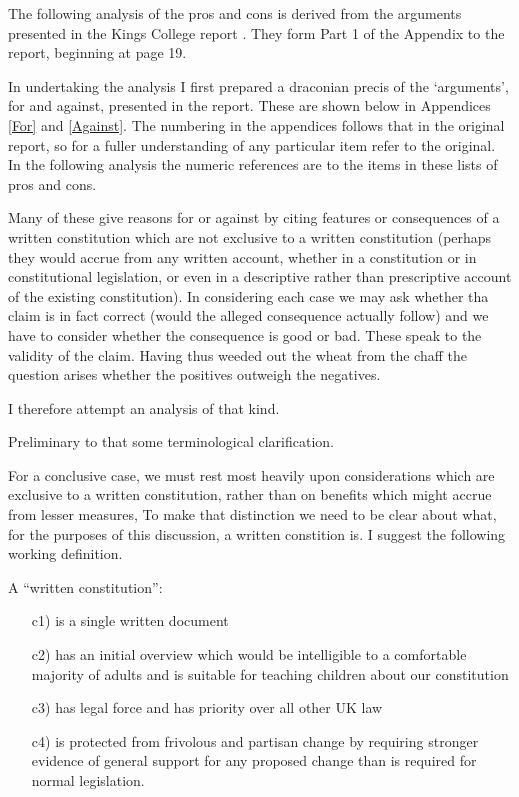 \documentclass[14pt,titlepage]{extarticle}
\begin{document}
The following analysis of the pros and cons is derived from the arguments presented in the Kings College report \cite{rbjw003}.
They form Part 1 of the Appendix to the report, beginning at page 19.

In undertaking the analysis I first prepared a draconian precis of the `arguments', for and against, presented in the report.
These are shown below in Appendices \ref{For} and \ref{Against}.
The numbering in the appendices follows that in the original report, so for a fuller understanding of any particular item refer to the original.
In the following analysis the numeric references are to the items in these lists of pros and cons.

Many of these give reasons for or against by citing features or consequences of a written constitution which are not exclusive to a written constitution (perhaps they would accrue from any written account, whether in a constitution or in constitutional legislation, or even in a descriptive rather than prescriptive account of the existing constitution).
In considering each case we may ask whether tha claim is in fact correct (would the alleged consequence actually follow) and we have to consider whether the consequence is good or bad.
These speak to the validity of the claim.
Having thus weeded out the wheat from the chaff the question arises whether the positives outweigh the negatives.

I therefore attempt an analysis of that kind.

Preliminary to that some terminological clarification.

For a conclusive case, we must rest most heavily upon considerations which are exclusive to a written constitution, rather than on benefits which might accrue from lesser measures,
To make that distinction we need to be clear about what, for the purposes of this discussion, a written constition is.
I suggest the following working definition.

A ``written constitution'':
\begin{itemize}
\item[c1)] is a single written document
\item[c2)] has an initial overview which would be intelligible to a comfortable majority of adults and is suitable for teaching children about our constitution
\item[c3)] has legal force and has priority over all other UK law
  \item[c4)] is protected from frivolous and partisan change by requiring stronger evidence of general support for any proposed change than is required for normal legislation.
\end{itemize}
\end{document}
